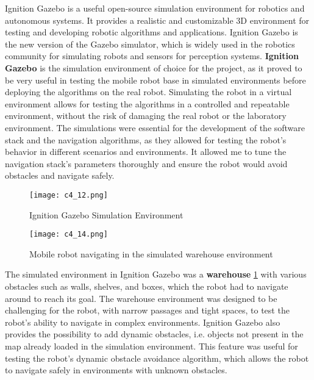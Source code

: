 Ignition Gazebo is a useful open-source simulation environment for robotics and autonomous systems.
It provides a realistic and customizable 3D environment for testing and developing robotic algorithms and applications.
Ignition Gazebo is the new version of the Gazebo simulator, which is widely used in the robotics community for simulating
robots and sensors for perception systems. \textbf{Ignition Gazebo} is the simulation environment of choice for the project,
as it proved to be very useful in testing the mobile robot base in simulated environments before deploying the algorithms
on the real robot. Simulating the robot in a virtual environment allows for testing the algorithms in 
a controlled and repeatable environment, without the risk of damaging the real robot or the laboratory environment.
The simulations were essential for the development of the software stack and the navigation algorithms, 
as they allowed for testing
the robot's behavior in different scenarios and environments. It allowed me to tune the navigation stack's parameters
thoroughly and ensure the robot would avoid obstacles and navigate safely.

\begin{figure}[t]
    \centering
    \texttt{[image: c4\_12.png]}
    \caption{Ignition Gazebo Simulation Environment}
    \label{fig:ignition}
\end{figure}

\begin{figure}[t]
    \centering
    \texttt{[image: c4\_14.png]}
    \caption{Mobile robot navigating in the simulated warehouse environment}
    \label{fig:warehousenav2}
\end{figure}

The simulated environment in Ignition Gazebo was a \textbf{warehouse} \ref{fig:ignition} 
with various obstacles such as walls, shelves, and boxes,
which the robot had to navigate around to reach its goal. The warehouse environment was designed to be challenging
for the robot, with narrow passages and tight spaces, to test the robot's ability to navigate in complex environments.
Ignition Gazebo also provides the possibility to add dynamic obstacles, i.e. objects not present in the map
already loaded in the simulation environment. This feature was useful for testing the robot's dynamic obstacle avoidance
algorithm, which allows the robot to navigate safely in environments with unknown obstacles.

